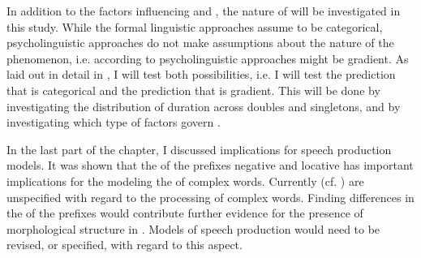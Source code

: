 In addition to the factors influencing  and , the nature of  will be investigated in this study. While the formal linguistic approaches assume  to be categorical, psycholinguistic approaches do not make assumptions about the nature of the phenomenon, i.e. according to psycholinguistic approaches  might be gradient. As laid out in detail in , I will test both possibilities, i.e. I will test the prediction that  is categorical and the prediction that  is gradient. This will be done by investigating the distribution of duration across doubles and singletons, and by investigating which type of factors govern .

In the last part of the chapter, I discussed implications for speech production models. It was shown that the  of the  prefixes negative and locative  has important implications for the modeling the  of complex words. Currently  (cf. \citealt{Dell.1986,Johnson.1997b,Levelt.1999b,Bybee.2002,Pierrehumbert.2001,Pierrehumbert.2002}) are unspecified with regard to the processing of complex words. Finding differences in the  of the  prefixes would contribute further evidence for the presence of morphological structure in . Models of speech production would need to be revised, or specified, with regard to this aspect.
